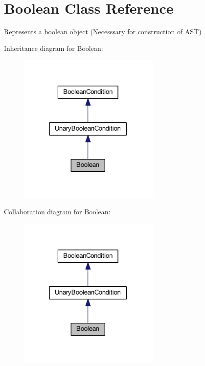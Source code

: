 \hypertarget{class_boolean}{\section{Boolean Class Reference}
\label{class_boolean}
}


Represents a boolean object (Necesssary for construction of A\-S\-T)  




Inheritance diagram for Boolean\-:\nopagebreak
\begin{figure}[H]
\begin{center}
\leavevmode
\includegraphics[width=198pt]{class_boolean__inherit__graph}
\end{center}
\end{figure}


Collaboration diagram for Boolean\-:\nopagebreak
\begin{figure}[H]
\begin{center}
\leavevmode
\includegraphics[width=198pt]{class_boolean__coll__graph}
\end{center}
\end{figure}
